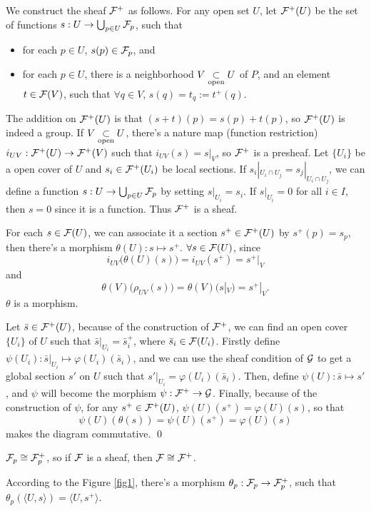 \documentclass[12pt]{extbook}
\begin{document}
\proof 
	We construct the sheaf $\mathcal{F}^+$ as follows. For any open set $U$, let $\mathcal{F}^+(U)$ be the set of functions $s:U\to \bigcup_{p\in U}\mathcal{F}_p$, such that
	\begin{itemize}
		\item for each $p\in U$, $s(p)\in \mathcal{F}_p$, and

		\item for each $p\in U$, there is a neighborhood $V\underset{\mathrm{open}}{\subset} U$ of $P$, and an element $t\in\mathcal{F}(V)$, such that $\forall q\in V$, $s(q)=t_q:=t^+(q)$.
	\end{itemize}

	The addition on $\mathcal{F}^+(U)$ is that $(s+t)(p)=s(p)+t(p)$, so $\mathcal{F}^+(U)$ is indeed a group. If $V\underset{\mathrm{open}}{\subset} U$, there's a nature map (function restriction) $i_{UV}:\mathcal{F}^+(U)\to \mathcal{F}^+(V)$ such that $i_{UV}(s)=s|_V$, so $\mathcal{F}^+$ is a presheaf. Let $\{U_i\}$ be a open cover of $U$ and $s_i\in \mathcal{F}^+(U_i)$ be local sections. If $s_i|_{U_i\cap U_j}=s_j|_{U_i\cap U_j}$, we can define a function $s:U\to \bigcup_{p\in U}\mathcal{F}_p$ by setting $s|_{U_i}=s_i$. If $s|_{U_i}=0$ for all $i\in I$, then $s=0$ since it is a function. Thus $\mathcal{F}^+$ is a sheaf.

	For each $s\in \mathcal{F}(U)$, we can associate it a section $s^+\in \mathcal{F}^+(U)$ by $s^+(p)=s_p$, then there's a morphism $\theta(U):s\mapsto s^+$. $\forall s\in \mathcal{F}(U)$, since
	\[
		i_{UV}\bigl(\theta(U)(s)\bigr)=i_{UV}(s^+)=s^+|_{V}
	\]
	and
	\[
		\theta(V)\bigl(\rho_{UV}(s)\bigr)=\theta(V)(s|_V)=s^+|_{V}.
	\]
	$\theta$ is a morphism.

	Let $\bar{s}\in \mathcal{F}^+(U)$, because of the construction of $\mathcal{F}^+$, we can find an open cover $\{U_i\}$ of $U$ such that $\bar{s}|_{U_i}=\bar{s}^+_i$, where $\bar{s}_i\in \mathcal{F}(U_i)$. Firstly define $\psi(U_i):\bar{s}|_{U_i}\mapsto \varphi(U_i)(\bar{s}_i)$, and we can use the sheaf condition of $\mathcal{G}$ to get a global section $s'$ on $U$ such that $s'|_{U_i}=\varphi(U_i)(\bar{s}_i)$. Then, define $\psi(U):\bar{s}\mapsto s'$, and $\psi$ will become the morphism $\psi:\mathcal{F}^+\to \mathcal{G}$. Finally, because of the construction of $\psi$, for any $s^+\in \mathcal{F}^+(U)$, $\psi(U)(s^+)=\varphi(U)(s)$, so that
	\[
		\psi(U)(\theta(s))=\psi(U)(s^+)=\varphi(U)(s)
	\]
	makes the diagram commutative. \qed

\pro 
	\label{pro:4} $\mathcal{F}_p\cong \mathcal{F}^+_p$, so if $\mathcal{F}$ is a sheaf, then $\mathcal{F}\cong \mathcal{F}^+$.

\proof According to the Figure \ref{fig1}, there's a morphism $\theta_p:\mathcal{F}_p\to \mathcal{F}^+_p$, such that $\theta_p(\langle U,s\rangle)=\langle U,s^+\rangle$.
\end{document}
